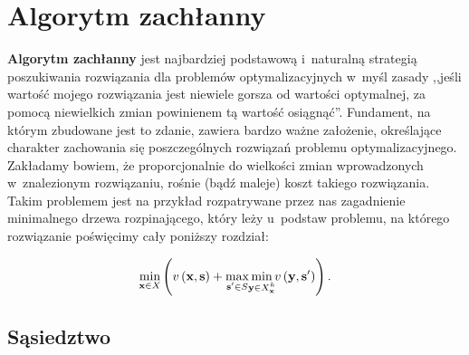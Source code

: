 \section{Algorytm zachłanny}




\textbf{Algorytm zachłanny} jest najbardziej podstawową i~naturalną strategią poszukiwania rozwiązania dla problemów optymalizacyjnych w~myśl zasady ,,jeśli wartość mojego rozwiązania jest niewiele gorsza od wartości optymalnej, za pomocą niewielkich zmian powinienem tą wartość osiągnąć''.
Fundament, na którym zbudowane jest to zdanie, zawiera bardzo ważne założenie, określające charakter zachowania się poszczególnych rozwiązań problemu optymalizacyjnego.
Zakładamy bowiem, że proporcjonalnie do wielkości zmian wprowadzonych w~znalezionym rozwiązaniu, rośnie (bądź maleje) koszt takiego rozwiązania.
Takim problemem jest na przykład rozpatrywane przez nas zagadnienie minimalnego drzewa rozpinającego, który leży u~podstaw problemu, na którego rozwiązanie poświęcimy cały poniższy rozdział:

\begin{equation}\label{eq:rrimst}
	\min_{\mathclap{\textbf{x} \in X}} \left( v \left( \textbf{x}, \textbf{s} \right) + \max_{\mathclap{\textbf{s}^{\prime} \in S}} \min_{\mathclap{\textbf{y} \in X^{k}_{\textbf{x}}}} v \left( \textbf{y}, \textbf{s}^{\prime} \right) \right)\text{.}
\end{equation}



\subsection{Sąsiedztwo}



